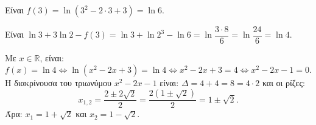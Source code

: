 \begin{alist}
\item Είναι $f(3) = \ln(3^2 - 2\cdot 3 + 3) = \ln 6$.
\item Είναι $\ln 3 + 3\ln 2 - f(3) = \ln 3 + \ln 2^3 - \ln 6 = \ln\dfrac{3\cdot 8}{6} = \ln\dfrac{24}{6} = \ln 4$.
\item Με $x \in \mathbb{R}$, είναι:
\[f(x) = \ln 4 \Leftrightarrow \ln(x^2 - 2x + 3) = \ln 4 \Leftrightarrow x^2 - 2x + 3 = 4 \Leftrightarrow x^2 - 2x - 1 = 0.\]
Η διακρίνουσα του τριωνύμου $x^2 - 2x - 1$ είναι: $\Delta = 4 + 4 = 8 = 4\cdot 2$ και οι ρίζες: 
\[x_{1,2} = \frac{2 \pm 2\sqrt{2}}{2} = \frac{2(1 \pm \sqrt{2})}{2} = 1 \pm \sqrt{2}.\]
Άρα: $x_1 = 1 + \sqrt{2}$ και $x_2 = 1 - \sqrt{2}$.
\end{alist}

